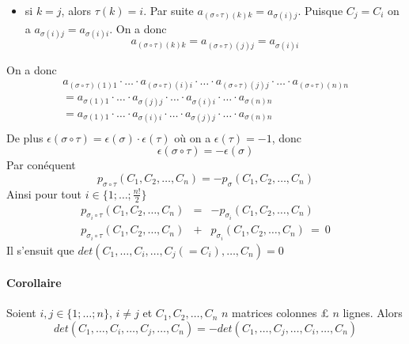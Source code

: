 \begin{enumerate}
\begin{itemize}
      \item si $k = j$, alors $\tau(k) = i$. Par suite $a_{(\sigma \circ \tau)(k) k} = a_{\sigma(i) j}$. Puisque $C_j = C_i$ on a $a_{\sigma(i) j} = a_{\sigma(i) i}$. On a donc
        $$a_{(\sigma \circ \tau)(k) k} = a_{(\sigma \circ \tau)(j) j} = a_{\sigma(i) i}$$
    \end{itemize}
    On a donc
    \begin{eqnarray*}
      a_{(\sigma \circ \tau)(1) 1} \cdot \ldots \cdot a_{(\sigma \circ \tau)(i) i} \cdot \ldots \cdot a_{(\sigma \circ \tau)(j) j} \cdot \ldots \cdot a_{(\sigma \circ \tau)(n) n} \\
        = a_{\sigma(1) 1} \cdot \ldots \cdot a_{\sigma(j) j} \cdot \ldots \cdot a_{\sigma(i) i} \cdot \ldots \cdot a_{\sigma(n) n} \\
        = a_{\sigma(1) 1} \cdot \ldots \cdot a_{\sigma(i) i} \cdot \ldots \cdot a_{\sigma(j) j} \cdot \ldots \cdot a_{\sigma(n) n} \\
    \end{eqnarray*}
    De plus $\epsilon(\sigma \circ \tau) = \epsilon(\sigma) \cdot \epsilon(\tau)$ où on a $\epsilon(\tau) = -1$, donc
    $$\epsilon(\sigma \circ \tau) = -\epsilon(\sigma)$$
    Par conéquent 
    $$p_{\sigma \circ \tau}(C_1, C_2, \ldots, C_n) = -p_{\sigma}(C_1, C_2, \ldots, C_n)$$
    Ainsi pour tout $i\in \{1; \ldots; \frac{n!}{2}\}$
    \begin{eqnarray*}
      p_{\sigma_i \circ \tau}(C_1, C_2, \ldots, C_n) &=& -p_{\sigma_i}(C_1, C_2, \ldots, C_n) \\
      p_{\sigma_i \circ \tau}(C_1, C_2, \ldots, C_n) &+& p_{\sigma_i}(C_1, C_2, \ldots, C_n) ~=~ 0
    \end{eqnarray*}
    Il s'ensuit que $det(C_1, \ldots, C_i, \ldots, C_j(=C_i), \ldots, C_n) = 0$
\end{enumerate}

\paragraph{Corollaire} Soient $i, j \in \{1; \ldots; n\}$, $i\neq j$ et $C_1, C_2, \ldots, C_n$ $n$ matrices colonnes £ $n$ lignes. Alors
$$det(C_1, \ldots, C_i, \ldots, C_j, \ldots, C_n) = -det(C_1, \ldots, C_j, \ldots, C_i, \ldots, C_n)$$

